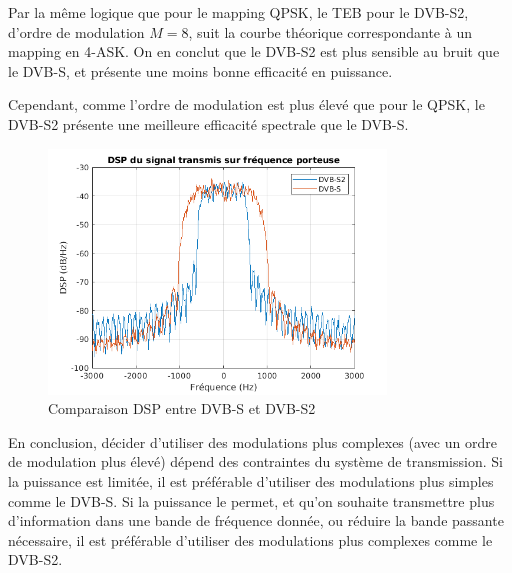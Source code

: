 \documentclass[a4paper, 12pt]{article}
\begin{document}
Par la même logique que pour le mapping QPSK, le TEB pour le DVB-S2, d'ordre de
modulation $M = 8$, suit la courbe théorique correspondante à un mapping en
4-ASK. On en conclut que le DVB-S2 est plus sensible au bruit que le DVB-S, et
présente une moins bonne efficacité en puissance. \medbreak

Cependant, comme l'ordre de modulation est plus élevé que pour le QPSK, le
DVB-S2 présente une meilleure efficacité spectrale que le DVB-S.

\begin{figure}[H]
    \centering
    \includegraphics[width=0.8\textwidth]{graphics/4-3.png}
    \caption{Comparaison DSP entre DVB-S et DVB-S2}
    \label{fig:dsp_dvbs_dvbs2}
\end{figure}

En conclusion, décider d'utiliser des modulations plus complexes (avec un ordre
de modulation plus élevé) dépend des contraintes du système de transmission. Si
la puissance est limitée, il est préférable d'utiliser des modulations plus
simples comme le DVB-S. Si la puissance le permet, et qu'on souhaite transmettre
plus d'information dans une bande de fréquence donnée, ou réduire la bande
passante nécessaire, il est préférable d'utiliser des modulations plus complexes
comme le DVB-S2.
\end{document}
